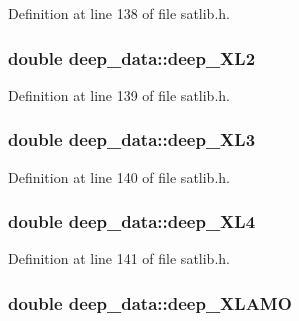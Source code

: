 Definition at line 138 of file satlib.\-h.

\hypertarget{structdeep__data_a0edbe1e981578d04f450c07fd8b8c4f1}{
\subsubsection[{deep\-\_\-\-X\-L2}]{\setlength{\rightskip}{0pt plus 5cm}double deep\-\_\-data\-::deep\-\_\-\-X\-L2}}\label{structdeep__data_a0edbe1e981578d04f450c07fd8b8c4f1}


Definition at line 139 of file satlib.\-h.

\hypertarget{structdeep__data_a1a7ad4a4863fcdadc6985073e5bc74db}{
\subsubsection[{deep\-\_\-\-X\-L3}]{\setlength{\rightskip}{0pt plus 5cm}double deep\-\_\-data\-::deep\-\_\-\-X\-L3}}\label{structdeep__data_a1a7ad4a4863fcdadc6985073e5bc74db}


Definition at line 140 of file satlib.\-h.

\hypertarget{structdeep__data_a61fd91e1b862a41ccf44565bdba236a5}{
\subsubsection[{deep\-\_\-\-X\-L4}]{\setlength{\rightskip}{0pt plus 5cm}double deep\-\_\-data\-::deep\-\_\-\-X\-L4}}\label{structdeep__data_a61fd91e1b862a41ccf44565bdba236a5}


Definition at line 141 of file satlib.\-h.

\hypertarget{structdeep__data_a87b3fc130401bf4182aed064313ade8c}{
\subsubsection[{deep\-\_\-\-X\-L\-A\-M\-O}]{\setlength{\rightskip}{0pt plus 5cm}double deep\-\_\-data\-::deep\-\_\-\-X\-L\-A\-M\-O}}\label{structdeep__data_a87b3fc130401bf4182aed064313ade8c}


